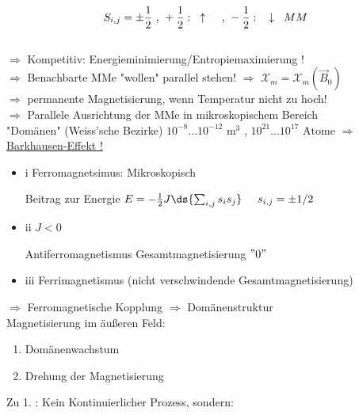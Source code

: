 \begin{itemize}
	$$ S_{i,j} = \pm \frac{1}{2}\text{ , } +\frac{1}{2}: \hspace{3mm}\uparrow \hspace{3mm} \text{ , } -\frac{1}{2}: \hspace{3mm}\textbf{$ \downarrow $} \hspace{3mm} MM$$\\
	$ \Rightarrow $ Kompetitiv: Energieminimierung/Entropiemaximierung !\\
	$ \Rightarrow $ Benachbarte MMe "wollen" parallel stehen!
	$ \Rightarrow $ $ \mathcal{X}_m =\mathcal{X}_m (\vec{B}_0) $ \\
	$ \Rightarrow $ permanente Magnetisierung, wenn Temperatur nicht zu hoch! \\
	$ \Rightarrow $ Parallele Ausrichtung der MMe in mikroskopischem Bereich\\
	\hspace{5mm}"Domänen" (Weiss'sche Bezirke) \hspace{3mm} $ 10^{-8} ... 10^{-12} \text{ m}^3 $ \hspace{2mm},\hspace{2mm} $ 10^{21}...10^{17} \text{ Atome} $
	$ \Rightarrow $ \underline{Barkhausen-Effekt !}
\end{itemize}
\newpage
\begin{itemize}
	\item i Ferromagnetsimus: Mikroskopisch \\
	\bild
	
	Beitrag zur Energie $ E= - \frac{1}{2}J \ds{\sum_{i,j} s_i s_j} \hspace{5mm} s_{i,j} = \pm 1/2 $ \\
	\item ii $ J<0 $ \\
	\bild
	
	Antiferromagnetismus
	Gesamtmagnetisierung $ "0" $
	\item iii
	\bild
	Ferrimagnetismus (nicht verschwindende Gesamtmagnetisierung)
\end{itemize}
$ \Rightarrow $ Ferromagnetische Kopplung $ \Rightarrow $ Domänenstruktur\\ \break
Magnetisierung im äußeren Feld:
\bild

\begin{enumerate}
	\item Domänenwachstum
	\item Drehung der Magnetisierung
\end{enumerate}

Zu 1. : Kein Kontinuierlicher Prozess, sondern:

